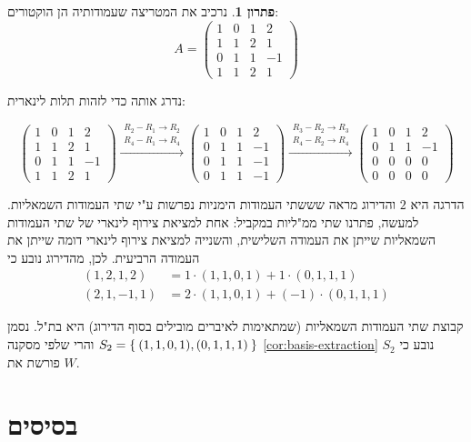 \documentclass[12pt]{report}
\theoremstyle{plain}
\theoremstyle{definition}
\newtheorem*{solution}{פתרון}
\newcommand{\0}{\mathbf{0}}
\begin{document}
\begin{solution}
נרכיב את המטריצה שעמודותיה הן הוקטורים:
$$ 
A=\begin{pmatrix}
1&0&1&2\\
1&1&2&1\\
0&1&1&-1\\
1&1&2&1
\end{pmatrix}
$$

נדרג אותה כדי לזהות תלות לינארית:

$$
\begin{pmatrix}
1&0&1&2\\
1&1&2&1\\
0&1&1&-1\\
1&1&2&1
\end{pmatrix}
\xrightarrow{\substack{R_2-R_1\to R_2\\ R_4-R_1\to R_4}}
\begin{pmatrix}
1&0&1&2\\
0&1&1&-1\\
0&1&1&-1\\
0&1&1&-1
\end{pmatrix}\xrightarrow{\substack{R_3-R_2\to R_3\\ R_4-R_2\to R_4}}
\begin{pmatrix}
1&0&1&2\\
0&1&1&-1\\
0&0&0&0\\
0&0&0&0
\end{pmatrix}
$$

הדרגה היא 
$2$
והדירוג מראה שששתי העמודות הימניות נפרשות ע"י שתי העמודות השמאליות. למעשה, פתרנו שתי ממ"ליות במקביל: אחת למציאת צירוף לינארי של שתי העמודות השמאליות שייתן את העמודה השלישית, והשנייה למציאת צירוף לינארי דומה שייתן את העמודה הרביעית. לכן, מהדירוג נובע כי
$$
\begin{aligned}
(1,2,1,2)&=1\cdot(1,1,0,1)+1\cdot(0,1,1,1) \\
(2,1,-1,1)&=2\cdot(1,1,0,1)+(-1)\cdot(0,1,1,1)
\end{aligned}
$$

קבוצת שתי העמודות השמאליות (שמתאימות לאיברים מובילים בסוף הדירוג) היא בת"ל. נסמן 
$S_2=\Set{(1,1,0,1),(0,1,1,1)}$
והרי שלפי מסקנה
\ref{cor:basis-extraction}
נובע כי
$S_2$
פורשת את
$W$.

\end{solution}

\section{בסיסים}
\end{document}
